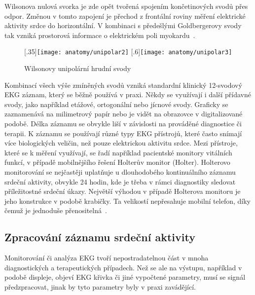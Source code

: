 \begin{enumerate}
	      Wilsonova nulová svorka je zde opět tvořená spojením končetinových
	      svodů přes odpor. Změnou v tomto zapojení je přechod z frontální
	      roviny měření elektrické aktivity srdce do horizontální. V kombinaci s
	      předešlými Goldbergerovy svody tak vzniká prostorová informace o
	      elektrickém poli myokardu~\cite{Kittnar2020}.
	      \begin{figure}[h]
		      \centering
		      [.35\linewidth]{\texttt{[image: anatomy/unipolar2]}}
		      \hfill
			      [.6\linewidth]{\texttt{[image: anatomy/unipolar3]}}
		      \caption{Wilsonovy unipolární hrudní svody}
		      \label{fig:wilson}
	      \end{figure}
\end{enumerate}

Kombinací všech výše zmíněných svodů vzniká standardní klinický 12-svodový EKG
záznam, který se běžně používá v praxi. Někdy se využívají i další přídavné
svody, jako například etážové, ortogonální nebo jícnové svody. Graficky se
zaznamenává na milimetrový papír nebo je vidět na obrazovce v digitalizované
podobě. Délka záznamu se obvykle liší v závislosti na prováděné diagnostice či
terapii. K záznamu se používají různé typy EKG přístrojů, které často snímají
více biologických veličin, než pouze elektrickou aktivitu srdce. Mezi přístroje,
které se k měření využívají, se řadí například pacientské monitory vitálních
funkcí, v případě mobilnějšího řešení Holterův monitor (Holter). Holterovo
monitorování se nejčastěji uplatňuje u dlouhodobého kontinuálního záznamu
srdeční aktivity, obvykle 24 hodin, kde je třeba v rámci diagnostiky sledovat
příležitostné srdeční úkazy. Největší výhodou v případě Holterova monitoru je
jeho konstrukce v podobě krabičky. Ta velikostí nepřesahuje mobilní telefon,
díky čemuž je jednoduše přenositelná~\cite{Surawicz2008}.

\subsection{Zpracování záznamu srdeční aktivity}
\label{section:ecg_processing_theory}
Monitorování či analýza EKG tvoří nepostradatelnou část v mnoha diagnostických a
terapeutických případech. Než se ale na výstupu, například v podobě displeje,
objeví EKG křivka či jiné vypočtené parametry, musí se signál
předzpracovat, jinak by tyto parametry byly v praxi zavádějící.

